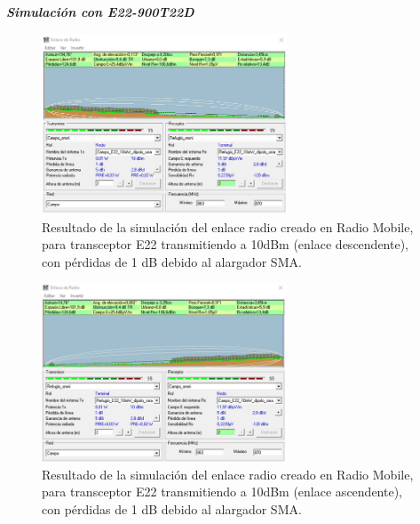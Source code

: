 \documentclass[12pt]{article}
\begin{document}
	\pagebreak
	
	\noindent \textit{\textbf{Simulación con E22-900T22D}} \\
	\begin{figure}[h!]
		\begin{center}
			\includegraphics[width=0.65\textwidth]{img/resultado_e22_10mW_conPerdidas_desc.png}
			\caption{Resultado de la simulación del enlace radio creado en Radio Mobile, para transceptor E22 transmitiendo a 10dBm (enlace descendente), con pérdidas de 1 dB debido al alargador SMA.}
			\label{fig: resultado enlace e22 10mW descendente con perdidas radio mobile}
		\end{center}
	\end{figure}
	
	
	\begin{figure}[h!]
		\begin{center}
			\includegraphics[width=0.65\textwidth]{img/resultado_e22_10mW_conPerdidas_asc.png}
			\caption{Resultado de la simulación del enlace radio creado en Radio Mobile, para transceptor E22 transmitiendo a 10dBm (enlace ascendente), con pérdidas de 1 dB debido al alargador SMA.}
			\label{fig: resultado enlace e22 10mW ascendente con perdidas radio mobile}
		\end{center}
	\end{figure}
	
\end{document}
